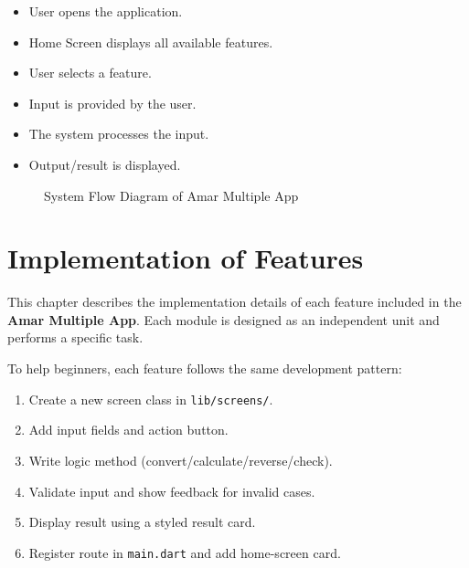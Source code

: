 \documentclass{article}
\begin{document}
\begin{itemize}
\item User opens the application.
\item Home Screen displays all available features.
\item User selects a feature.
\item Input is provided by the user.
\item The system processes the input.
\item Output/result is displayed.
\end{itemize}

\begin{figure}[H]
\centering
{}
\caption{System Flow Diagram of Amar Multiple App}
\end{figure}



\section{Implementation of Features}

This chapter describes the implementation details of each feature included in the \textbf{Amar Multiple App}. Each module is designed as an independent unit and performs a specific task.

\begin{insightbox}
To help beginners, each feature follows the same development pattern:
\begin{enumerate}
\item Create a new screen class in \texttt{lib/screens/}.
\item Add input fields and action button.
\item Write logic method (convert/calculate/reverse/check).
\item Validate input and show feedback for invalid cases.
\item Display result using a styled result card.
\item Register route in \texttt{main.dart} and add home-screen card.
\end{enumerate}
\end{insightbox}
\end{document}
